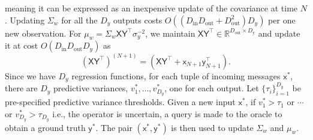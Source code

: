 \documentclass[english]{article}
\theoremstyle{plain}
\theoremstyle{plain}
\newcommand{\feax}{\mathsf{x}}
\newcommand{\feaX}{\mathsf{X}}
\newcommand{\feay}{\mathsf{y}}
\newcommand{\feaY}{\mathsf{Y}}
\newcommand{\wjnote}[1]{ }
\begin{document}
meaning it can be expressed
as an inexpensive update of
the covariance at time $N$.
Updating $\Sigma_{w}$ for all the $D_y$ outputs costs 
$O( (D_\mathrm{in}D_\mathrm{out} + D_\mathrm{out}^{2}) D_y)$ 
per one new observation. 
For $\mu_{w}= \Sigma_{w} \mathsf{X} \mathsf{Y}^{\top}\sigma_{y}^{-2}$, we maintain
$ \mathsf{X} \mathsf{Y}^{\top}\in\mathbb{R}^{D_{\mathrm{out}}\times D_{\mathrm{y}}}$ and update it
at cost $O(D_\mathrm{in}D_\mathrm{out}D_y)$ as
\begin{equation}
\left( \feaX \feaY^{\top}\right)^{(N+1)}=\left( \feaX \feaY^{\top}+ \feax_{N+1} \feay^\top_{N+1}\right).
\end{equation}
%
%
Since we have $D_{y}$ regression functions, 
for each tuple of incoming messages $\feax^{*}$, there are $D_{y}$
predictive variances, $v_{1}^{*},\ldots,v_{D_{y}}^{*}$, one for each
output. 
Let $\{\tau_{i}\}_{i=1}^{D_{y}}$ be pre-specified predictive variance thresholds.
Given a new input $\feax^{*}$, if $v_{1}^{*}>\tau_{1}$ or $\cdots$
or $v_{D_{y}}^{*}>\tau_{D_{y}}$ i.e., the operator is uncertain, 
a query is made to the oracle to obtain a ground truth $\feay^{*}$. 
The pair $(\feax^{*}, \feay^{*})$ is then
used to update $\Sigma_{w}$ and $\mu_{w}$.%

\end{document}
